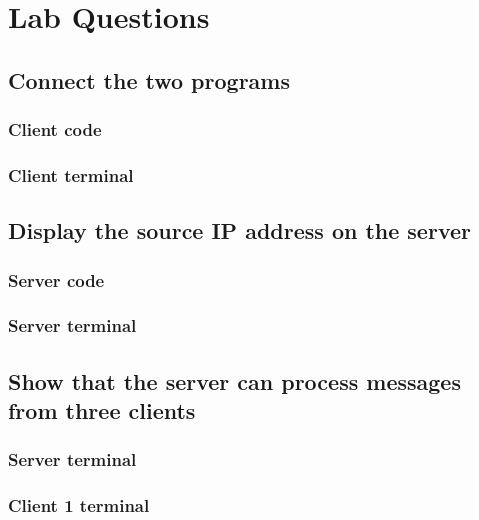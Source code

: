 \documentclass[a4paper,12pt]{article}
\begin{document}

\section{Lab Questions}

\subsection{Connect the two programs}

\subsubsection{Client code}

\subsubsection{Client terminal}


\subsection{Display the source IP address on the server}

\subsubsection{Server code}

\subsubsection{Server terminal}

\subsection{Show that the server can process messages from three clients}

\subsubsection{Server terminal}

\subsubsection{Client 1 terminal}
\end{document}
